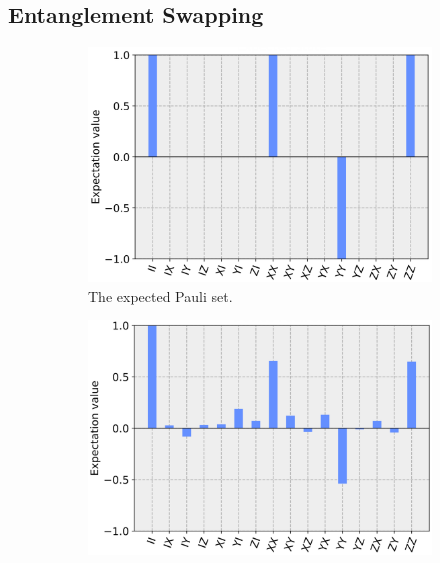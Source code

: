 
\subsection{Entanglement Swapping}

\begin{figure}[h!]
	\begin{subfigure}{.5\textwidth} \centering %
		\includegraphics[width=.8\linewidth]{images/results/swap_pauli_sim.png}
		\caption{The expected Pauli set.}
		\label{fig:swap_pauli_sim}
	\end{subfigure} \newline
	\begin{subfigure}{.5\textwidth} \centering %
		\includegraphics[width=.8\linewidth]{images/results/swap_pauli_dev.png}

\end{subfigure}
\end{figure}
